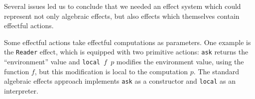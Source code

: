 \documentclass[acmsmall,fleqn]{acmart}
\begin{document}
Several issues led us to conclude that we needed an effect system which could
represent not only algebraic effects, but also effects which themselves contain
effectful actions.

%
%
%
%

Some effectful actions take effectful computations as parameters. One example is the
\texttt{Reader} effect, which is equipped with two primitive actions:
\texttt{ask} returns the ``environment'' value and \texttt{local $f$ $p$}
modifies the environment value, using the function $f$, but this modification
is local to the computation $p$. The standard algebraic effects approach implements
\texttt{ask} as a constructor and \texttt{local} as an interpreter.
\end{document}
